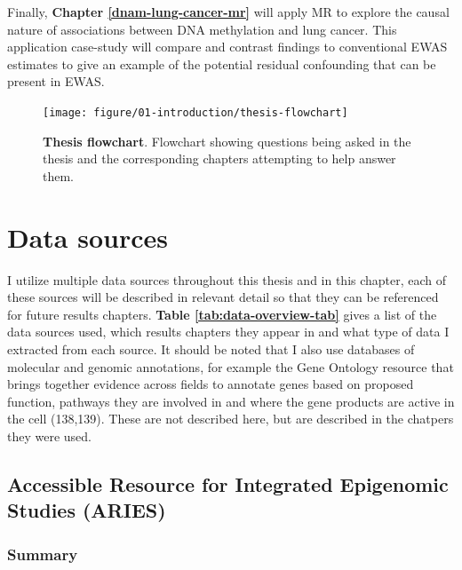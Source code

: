 \documentclass[11pt,twoside]{bristolthesis}
\newcommand{\blandscape}{\begin{landscape}}
\newcommand{\elandscape}{\end{landscape}}
\begin{document}
Finally, \textbf{Chapter \ref{dnam-lung-cancer-mr}} will apply MR to explore the causal nature of associations between DNA methylation and lung cancer. This application case-study will compare and contrast findings to conventional EWAS estimates to give an example of the potential residual confounding that can be present in EWAS.





\blandscape
\begin{figure}[htbp]

{\centering \texttt{[image: figure/01-introduction/thesis-flowchart]} 

}

\caption[Thesis flowchart]{\textbf{Thesis flowchart}. Flowchart showing questions being asked in the thesis and the corresponding chapters attempting to help answer them.}\label{fig:thesis-flowchart}
\end{figure}
\elandscape

\hypertarget{data-sources}{%
\chapter{Data sources}\label{data-sources}}

I utilize multiple data sources throughout this thesis and in this chapter, each of these sources will be described in relevant detail so that they can be referenced for future results chapters. \textbf{Table \ref{tab:data-overview-tab}} gives a list of the data sources used, which results chapters they appear in and what type of data I extracted from each source. It should be noted that I also use databases of molecular and genomic annotations, for example the Gene Ontology resource that brings together evidence across fields to annotate genes based on proposed function, pathways they are involved in and where the gene products are active in the cell (138,139). These are not described here, but are described in the chatpers they were used.

\hypertarget{aries-02}{%
\section{Accessible Resource for Integrated Epigenomic Studies (ARIES)}\label{aries-02}}

\hypertarget{aries-summary}{%
\subsection{Summary}\label{aries-summary}}
\end{document}

